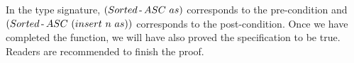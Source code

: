 \par In the type signature, \((Sorted\hyphen ASC\ as)\) corresponds to the pre-condition and
\((Sorted\operatorname{-} ASC\ (insert\ n\ as))\) corresponds to the
post-condition. Once we have completed the
function, we will have also proved the specification to be
true. Readers are recommended to finish the proof. 